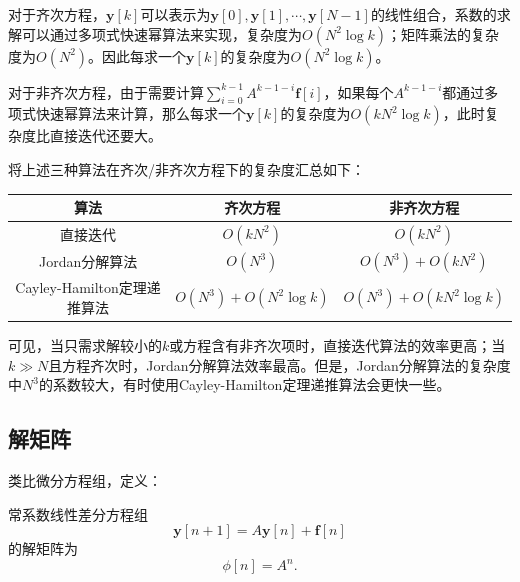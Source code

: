 对于齐次方程，$\mathbf{y}[k]$可以表示为$\mathbf{y}[0],\mathbf{y}[1],\cdots,\mathbf{y}[N-1]$的线性组合，系数的求解可以通过多项式快速幂算法来实现，复杂度为$O(N^2\log k)$；矩阵乘法的复杂度为$O(N^2)$。因此每求一个$\mathbf{y}[k]$的复杂度为$O(N^2\log k)$。

对于非齐次方程，由于需要计算$\sum_{i=0}^{k-1}A^{k-1-i}\mathbf{f}[i]$，如果每个$A^{k-1-i}$都通过多项式快速幂算法来计算，那么每求一个$\mathbf{y}[k]$的复杂度为$O(k N^2\log k)$，此时复杂度比直接迭代还要大。

将上述三种算法在齐次/非齐次方程下的复杂度汇总如下：
\begin{table}[H]
    \centering
    \begin{tabular}{|c|c|c|}
        \hline
        算法                         & 齐次方程                       & 非齐次方程                         \\
        \hline
        直接迭代                     & $O(k N^2)$                     & $O(k N^2)$                         \\
        \hline
        Jordan分解算法               & $O(N^3)$                       & $O(N^3)+O(k N^2)$                  \\
        \hline
        Cayley-Hamilton定理递推算法  & $O(N^3)+O(N^2 \log k)$         & $O(N^3)+O(k N^2 \log k)$           \\
        \hline
    \end{tabular}
\end{table}

可见，当只需求解较小的$k$或方程含有非齐次项时，直接迭代算法的效率更高；当$k\gg N$且方程齐次时，Jordan分解算法效率最高。但是，Jordan分解算法的复杂度中$N^3$的系数较大，有时使用Cayley-Hamilton定理递推算法会更快一些。

\subsection{解矩阵}\label{sub:fundamental_solution_matrix}

类比微分方程组，定义：
\begin{definition}[解矩阵]
    常系数线性差分方程组
    \begin{equation}
        \mathbf{y}[n+1]=A\mathbf{y}[n]+\mathbf{f}[n]
    \end{equation}
    的解矩阵为
    \begin{equation}
        \phi[n]=A^n.
    \end{equation}
\end{definition}

